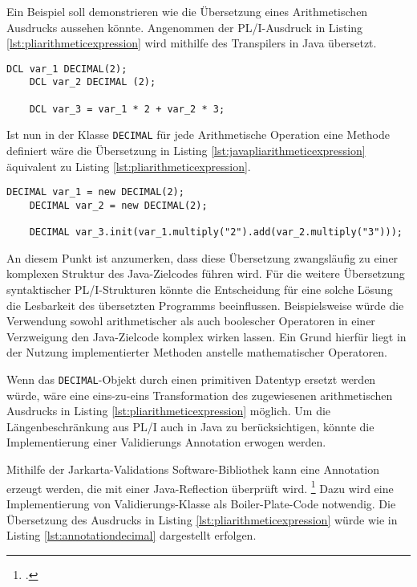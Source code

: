 Ein Beispiel soll demonstrieren wie die Übersetzung eines Arithmetischen Ausdrucks aussehen könnte.
Angenommen der PL/I-Ausdruck in Listing \ref{lst:pliarithmeticexpression} wird mithilfe des Transpilers in Java übersetzt.

\begin{lstlisting}[language=PL/I, caption=Arithmetischer Ausdruck in PL/I, label={lst:pliarithmeticexpression}]
	DCL var_1 DECIMAL(2);
	DCL var_2 DECIMAL (2);
	
	DCL var_3 = var_1 * 2 + var_2 * 3;
\end{lstlisting}
\pagebreak 
 
Ist nun in der Klasse \verb+DECIMAL+ für jede Arithmetische Operation eine Methode definiert wäre die Übersetzung in Listing \ref{lst:javapliarithmeticexpression} äquivalent zu Listing \ref{lst:pliarithmeticexpression}.

\begin{lstlisting}[language=PL/I, caption=Arithmetischer Ausdruck aus PL/I in Java, label={lst:javapliarithmeticexpression}]
	DECIMAL var_1 = new DECIMAL(2);
	DECIMAL var_2 = new DECIMAL(2);
	
	DECIMAL var_3.init(var_1.multiply("2").add(var_2.multiply("3")));
\end{lstlisting}

An diesem Punkt ist anzumerken, dass diese Übersetzung zwangsläufig zu einer komplexen Struktur des Java-Zielcodes führen wird. Für die weitere Übersetzung syntaktischer PL/I-Strukturen könnte die Entscheidung für eine solche Lösung die Lesbarkeit des übersetzten Programms beeinflussen. Beispielsweise würde die Verwendung sowohl arithmetischer als auch boolescher Operatoren in einer Verzweigung den Java-Zielcode komplex wirken lassen. Ein Grund hierfür liegt in der Nutzung implementierter Methoden anstelle mathematischer Operatoren.

Wenn das \verb+DECIMAL+-Objekt durch einen primitiven Datentyp ersetzt werden würde, wäre eine eins-zu-eins Transformation des zugewiesenen arithmetischen Ausdrucks in Listing \ref{lst:pliarithmeticexpression} möglich. Um die Längenbeschränkung aus PL/I auch in Java zu berücksichtigen, könnte die Implementierung einer Validierungs Annotation erwogen werden.

Mithilfe der Jarkarta-Validations Software-Bibliothek kann eine Annotation erzeugt werden, die mit einer Java-Reflection überprüft wird. \footcite[Vgl. ][]{jakarta}
Dazu wird eine Implementierung von Validierungs-Klasse als Boiler-Plate-Code  notwendig. 
Die Übersetzung des Ausdrucks in Listing \ref{lst:pliarithmeticexpression} würde wie in Listing \ref{lst:annotationdecimal} dargestellt erfolgen.

